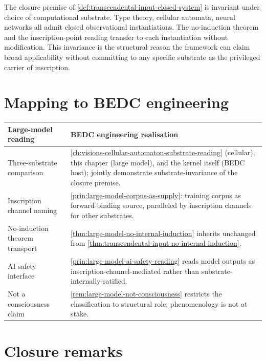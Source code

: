 \begin{principle}
\label{prin:large-model-closure-substrate-independent}
The closure premise of \autoref{def:transcendental-input-closed-system} is invariant under choice of computational substrate. Type theory, cellular automata, neural networks all admit closed observational instantiations. The no-induction theorem and the inscription-point reading transfer to each instantiation without modification. This invariance is the structural reason the framework can claim broad applicability without committing to any specific substrate as the privileged carrier of inscription.
\end{principle}

\section{Mapping to BEDC engineering}
\label{sec:large-model-mapping-engineering}

\begin{longtable}{p{}p{}}
\toprule
\textbf{Large-model reading} & \textbf{BEDC engineering realisation} \\
\midrule
Three-substrate comparison &
\autoref{ch:visions-cellular-automaton-substrate-reading} (cellular), this chapter (large model), and the kernel itself (BEDC host); jointly demonstrate substrate-invariance of the closure premise. \\
\midrule
Inscription channel naming &
\autoref{prin:large-model-corpus-as-supply}: training corpus as forward-binding source, paralleled by inscription channels for other substrates. \\
\midrule
No-induction theorem transport &
\autoref{thm:large-model-no-internal-induction} inherits unchanged from \autoref{thm:transcendental-input-no-internal-induction}. \\
\midrule
AI safety interface &
\autoref{prin:large-model-ai-safety-reading} reads model outputs as inscription-channel-mediated rather than substrate-internally-ratified. \\
\midrule
Not a consciousness claim &
\autoref{rem:large-model-not-consciousness} restricts the classification to structural role; phenomenology is not at stake. \\
\bottomrule
\end{longtable}

\section{Closure remarks}
\label{sec:large-model-closure}

